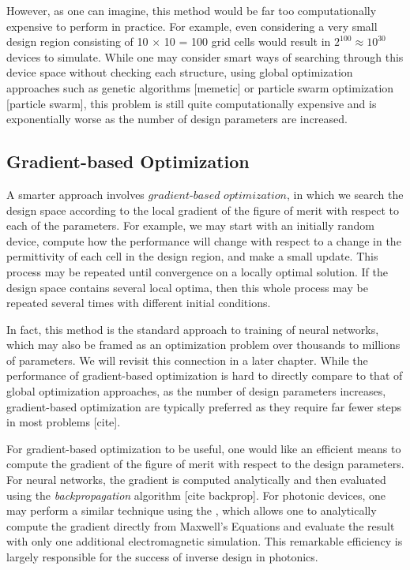 However, as one can imagine, this method would be far too computationally expensive to perform in practice.
For example, even considering a very small design region consisting of 10 $\times$ 10 = 100 grid cells would result in $2^{100} \approx 10^{30}$ devices to simulate.
While one may consider smart ways of searching through this device space without checking each structure, using global optimization approaches such as genetic algorithms [memetic] or particle swarm optimization [particle swarm], this problem is still quite computationally expensive and is exponentially worse as the number of design parameters are increased.

\subsection{Gradient-based Optimization}

A smarter approach involves $\textit{gradient-based optimization}$, in which we search the design space according to the local gradient of the figure of merit with respect to each of the parameters.
For example, we may start with an initially random device, compute how the performance will change with respect to a change in the permittivity of each cell in the design region, and make a small update.
This process may be repeated until convergence on a locally optimal solution.
If the design space contains several local optima, then this whole process may be repeated several times with different initial conditions.

In fact, this method is the standard approach to training of neural networks, which may also be framed as an optimization problem over thousands to millions of parameters.
We will revisit this connection in a later chapter.
While the performance of gradient-based optimization is hard to directly compare to that of global optimization approaches, as the number of design parameters increases, gradient-based optimization are typically preferred as they require far fewer steps in most problems [cite].

For gradient-based optimization to be useful, one would like an efficient means to compute the gradient of the figure of merit with respect to the design parameters.
For neural networks, the gradient is computed analytically and then evaluated using the \textit{backpropagation} algorithm [cite backprop].
For photonic devices, one may perform a similar technique using the , which allows one to analytically compute the gradient directly from Maxwell's Equations and evaluate the result with only one additional electromagnetic simulation.
This remarkable efficiency is largely responsible for the success of inverse design in photonics.

